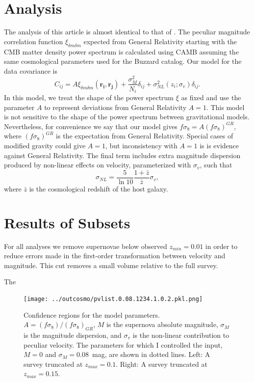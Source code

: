 \documentclass{aastex62}   	%
\begin{document}
\section{Analysis}
The analysis of this article is  almost identical to that of \citet{2015JCAP...12..033H, 2017JCAP...05..015H}.   The peculiar magnitude correlation
function $\xi_{\delta m \delta m}$ expected from General Relativity starting with the CMB
matter density power spectrum is calculated using CAMB \citep{Lewis:2002ah}  assuming the same
cosmological parameters used for the Buzzard catalog.  Our model for the data covariance
is
\begin{equation}
C_{ij} = A\xi_{\delta m \delta m}(\mathbf{r_i},\mathbf{r_j}) + \frac{\sigma_M^2}{N_i} \delta_{ij} + \sigma^2_{NL}(z_i;\sigma_{v})\delta_{ij}.
\end{equation}
In this model, we treat the shape of the power spectrum $\xi$ as fixed and use the parameter $A$ to represent
deviations from General Relativity $A=1$.  This model is not sensitive to  the shape of
the power spectrum between gravitational models.  Nevertheless, for
convenience we say that our model gives $f\sigma_8 = A (f\sigma_8)^{GR}$, where $(f\sigma_8)^{GR}$ is the expectation
from General Relativity.  Special cases of modified gravity could give $A=1$, but inconsistency with $A=1$ is is evidence against General Relativity.
The final term includes extra magnitude dispersion produced by non-linear effects on velocity, parameterized with $\sigma_{v}$, such that
\begin{equation}
\sigma_{NL} = \frac{5}{\ln{10}} \frac{1+\bar{z}}{\bar{z}} \sigma_v,
\end{equation}
where $\bar{z}$ is the cosmological redshift of the host galaxy.
\section{Results of Subsets}

For all analyses we remove supernovae below observed $z_{min}=0.01$ in order to
reduce errors made in the first-order transformation between velocity and
magnitude.  This cut removes a  small volume relative to the full survey.

The 
\begin{figure}
\centering
\texttt{[image: ../outcosmo/pvlist.0.08.1234.1.0.2.pkl.png]}
\caption{Confidence regions for the model parameters.  $A=(f\sigma_8)/(f\sigma_8)_{GR}$, $M$ is the supernova
absolute magnitude, $\sigma_M$ is the magnitude dispersion, and $\sigma_v$ is the non-linear contribution
to peculiar velocity.   The parameters for which I controlled the input, $M=0$ and $\sigma_M=0.08$~mag, are shown in dotted lines.
 Left: A survey truncated at $z_{max}=0.1$.  Right: A survey truncated at $z_{max}=0.15$.
\label{zmax:fig}}
\end{figure}
\end{document}
